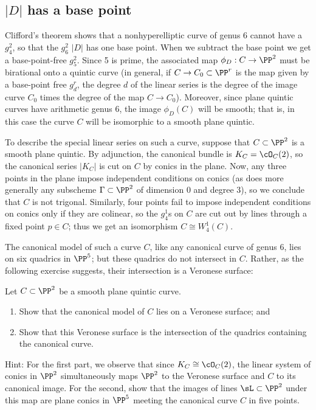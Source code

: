 \subsection{$|D|$ has a base point}\label{g26 has a base point}
Clifford's theorem shows that a nonhyperelliptic curve of genus 6 cannot have a $g^2_4$, so that the $g^2_6$ 
$|D|$ has one base point.
When we subtract the base point we get a base-point-free $g^2_5$. Since 5 is prime, the associated map $\phi_D : C \to \PP^2$ must be birational onto a quintic curve (in general, if $C \to C_0 \subset \PP^r$ is the map given by a base-point free $g^r_d$, the degree $d$ of the linear series is the degree of the image curve $C_0$ times the degree of the map $C \to C_0$). Moreover, since plane quintic curves have arithmetic genus 6, the image $\phi_D(C)$ will be smooth; that is, in this case the curve $C$ will be isomorphic to a smooth plane quintic.

To describe the special linear series on such a curve, suppose that $C \subset \PP^2$ is a smooth plane quintic. By adjunction, the canonical bundle is $K_C = \cO_C(2)$, so the canonical series $|K_C|$ is cut on $C$ by conics in the plane. Now, any three points in the plane impose independent conditions on conics (as does more generally any subscheme $\Gamma \subset \PP^2$ of dimension 0 and degree 3), so we  conclude that $C$ is not trigonal. Similarly, four points fail to impose independent conditions on conics only if they are colinear, so the $g^1_4$s on $C$ are cut out by lines through a fixed point $p \in C$; thus we get an isomorphism $C \cong W^1_4(C)$.

The canonical model of such a curve $C$, like any canonical curve of genus 6, lies on six quadrics in $\PP^5$; but these quadrics do not intersect in $C$. Rather, as the following exercise suggests, their intersection is a Veronese surface:

\begin{exercise}
Let $C \subset \PP^2$ be a smooth plane quintic curve.
\begin{enumerate}
\item Show that the canonical model of $C$ lies on a Veronese surface; and
\item Show that this Veronese surface is the intersection of the quadrics containing the canonical curve.
\end{enumerate}
\end{exercise}

Hint: For the first part, we observe that since $K_C \cong \cO_C(2)$, the linear system of conics in $\PP^2$ simultaneously maps $\PP^2$ to the Veronese surface and $C$ to its canonical image. For the second, show that the images of lines $\sL  \subset \PP^2$ under this map are plane conics in $\PP^5$ meeting the canonical curve $C$ in five points.

